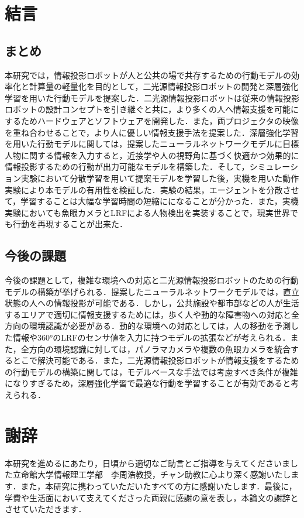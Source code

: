 \documentclass[12pt]{sonota/aislab}
\begin{document}
\chapter{結言}
\section{まとめ}
本研究では，情報投影ロボットが人と公共の場で共存するための行動モデルの効率化と計算量の軽量化を目的として，二光源情報投影ロボットの開発と深層強化学習を用いた行動モデルを提案した．二光源情報投影ロボットは従来の情報投影ロボットの設計コンセプトを引き継ぐと共に，より多くの人へ情報支援を可能にするためハードウェアとソフトウェアを開発した．また，両プロジェクタの映像を重ね合わせることで，より人に優しい情報支援手法を提案した．深層強化学習を用いた行動モデルに関しては，提案したニューラルネットワークモデルに目標人物に関する情報を入力すると，近接学や人の視野角に基づく快適かつ効果的に情報投影するための行動が出力可能なモデルを構築した．そして，シミュレーション実験において分散学習を用いて提案モデルを学習した後，実機を用いた動作実験により本モデルの有用性を検証した．実験の結果，エージェントを分散させて，学習することは大幅な学習時間の短縮にになることが分かった．また，実機実験においても魚眼カメラとLRFによる人物検出を実装することで，現実世界でも行動を再現することが出来た．

\section{今後の課題}
今後の課題として，複雑な環境への対応と二光源情報投影ロボットのための行動モデルの構築が挙げられる．提案したニューラルネットワークモデルでは，直立状態の人への情報投影が可能である．しかし，公共施設や都市部などの人が生活するエリアで適切に情報支援するためには，歩く人や動的な障害物への対応と全方向の環境認識が必要がある．動的な環境への対応としては，人の移動を予測した情報や360°のLRFのセンサ値を入力に持つモデルの拡張などが考えられる．また，全方向の環境認識に対しては，パノラマカメラや複数の魚眼カメラを統合するとこで解決可能である．また，二光源情報投影ロボットが情報支援をするための行動モデルの構築に関しては，モデルベースな手法では考慮すべき条件が複雑になりすぎるため，深層強化学習で最適な行動を学習することが有効であると考えられる．

\chapter*{謝辞}
本研究を進めるにあたり，日頃から適切なご助言とご指導を与えてくださいました立命館大学情報理工学部　李周浩教授，チャン助教に心より深く感謝いたします．また，本研究に携わっていただいたすべての方に感謝いたします．最後に，学費や生活面において支えてくださった両親に感謝の意を表し，本論文の謝辞とさせていただきます．
\end{document}
